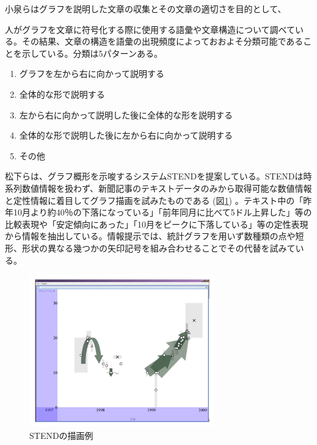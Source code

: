 \documentclass{matsushita-zemi}
\begin{document}

小泉らはグラフを説明した文章の収集とその文章の適切さを目的として、

人がグラフを文章に符号化する際に使用する語彙や文章構造について調べている。その結果、文章の構造を語彙の出現頻度によっておおよそ分類可能であることを示している。分類は5パターンある。
\begin{enumerate}
 \item グラフを左から右に向かって説明する
 \item 全体的な形で説明する
 \item 左から右に向かって説明した後に全体的な形を説明する
 \item 全体的な形で説明した後に左から右に向かって説明する
 \item その他
\end{enumerate}

松下らは、グラフ概形を示唆するシステムSTENDを提案している\cite{STEND}。STENDは時系列数値情報を扱わず、新聞記事のテキストデータのみから取得可能な数値情報と定性情報に着目してグラフ描画を試みたものである (図\ref{STEND}) 。テキスト中の「昨年10月より約40％の下落になっている」「前年同月に比べて5ドル上昇した」等の比較表現や「安定傾向にあった」「10月をピークに下落している」等の定性表現から情報を抽出している。情報提示では、統計グラフを用いず数種類の点や短形、形状の異なる幾つかの矢印記号を組み合わせることでその代替を試みている。
\begin{figure}[tb]
  \begin{center}
   \includegraphics[width=8cm,bb=0 0 512 422]{STEND.PNG}
  \end{center}
 \caption{STENDの描画例}
 \label{STEND}
\end{figure}
\end{document}
